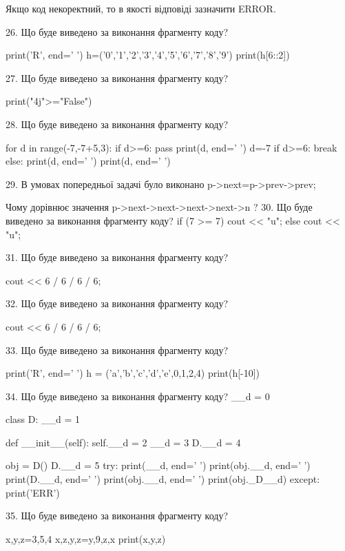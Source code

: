 \documentclass[11pt]{article}
\begin{document}
Якщо код некоректний, то в якості відповіді зазначити ERROR.



26. Що буде виведено за виконання фрагменту коду?

print('R', end=' ')
h=('0','1','2','3','4','5','6','7','8','9')
print(h[6::2])


27. Що буде виведено за виконання фрагменту коду?

print("4j">="False")

28. Що буде виведено за виконання фрагменту коду?

for d in range(-7,-7+5,3):
    if d>=6:
        pass
    print(d, end=' ')
    d=-7
    if d>=6:
        break
else:
    print(d, end=' ')
print(d, end=' ')

29. 
В умовах попередньої задачі було виконано p->next=p->prev->prev;

Чому дорівнює значення p->next->next->next->next->n ?
30. Що буде виведено за виконання фрагменту коду?
if (7 >= 7)
    cout << "u";
else
    cout << "u";


31. Що буде виведено за виконання фрагменту коду?

cout << 6 / 6 / 6 / 6;

32. Що буде виведено за виконання фрагменту коду?

cout << 6 / 6 / 6 / 6;

33. Що буде виведено за виконання фрагменту коду?

print('R', end=' ')
h = ('a','b','c','d','e',0,1,2,4)
print(h[-10])


34. Що буде виведено за виконання фрагменту коду?
__d = 0

class D:
    __d = 1
    
    def __init__(self):
        self.__d = 2
        __d = 3
        D.__d = 4

obj = D()
D.__d = 5
try:
    print(__d, end=' ')
    print(obj.__d, end=' ')
    print(D.__d, end=' ')
    print(obj.__d, end=' ')
    print(obj._D__d)
except:
    print('ERR')

35. Що буде виведено за виконання фрагменту коду?

x,y,z=3,5,4
x,z,y,z=y,9,z,x
print(x,y,z)
\end{document}
